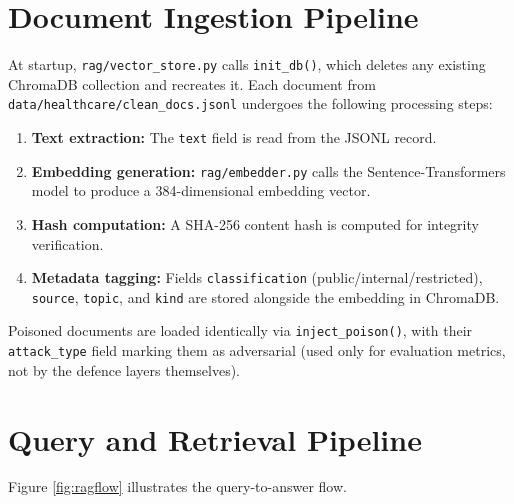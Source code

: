 \section{Document Ingestion Pipeline}

\justifying

At startup, \texttt{rag/vector\_store.py} calls \texttt{init\_db()}, which deletes any existing ChromaDB collection and recreates it. Each document from \texttt{data/healthcare/clean\_docs.jsonl} undergoes the following processing steps:

\begin{enumerate}
    \item \textbf{Text extraction:} The \texttt{text} field is read from the JSONL record.

    \item \textbf{Embedding generation:} \texttt{rag/embedder.py} calls the Sentence-Transformers model to produce a 384-dimensional embedding vector.

    \item \textbf{Hash computation:} A SHA-256 content hash is computed for integrity verification.

    \item \textbf{Metadata tagging:} Fields \texttt{classification} (public/internal/restricted),
    \texttt{source}, \texttt{topic}, and \texttt{kind} are stored alongside the embedding in ChromaDB.
\end{enumerate}

\noindent
Poisoned documents are loaded identically via \texttt{inject\_poison()}, with their \texttt{attack\_type} field marking them as adversarial (used only for evaluation metrics, not by the defence layers themselves).

\section{Query and Retrieval Pipeline}

Figure \ref{fig:ragflow} illustrates the query-to-answer flow.

